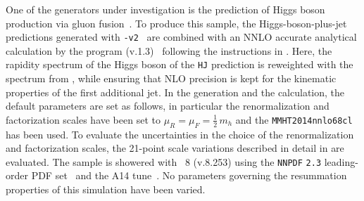\subsubsection{\Powheg \NNLOPS}
\label{sec:hjetscomp:tools:nnlops:powheg}

One of the generators under investigation is the \NNLOPS prediction 
of Higgs boson production via gluon fusion~\cite{Hamilton:2013fea}.
To produce this sample, the Higgs-boson-plus-jet \Minlo~\cite{Hamilton:2012np} 
predictions generated with \PowhegBox{}\texttt{-v2}~\cite{Campbell:2012am} 
are combined with an NNLO accurate analytical calculation by the 
program \HNNLO (v.1.3)~\cite{Catani:2007vq,Grazzini:2008tf,Grazzini:2013mca} 
following the instructions in \cite{Hamilton:2013fea}. Here, the rapidity 
spectrum of the Higgs boson of the \Powheg \texttt{HJ} \Minlo prediction 
is reweighted with the spectrum from \HNNLO, while ensuring that NLO 
precision is kept for the kinematic properties of the first additional jet. 
In the generation and the \HNNLO calculation, the default parameters are 
set as follows, in particular the renormalization and factorization scales 
have been set to $\mu_R = \mu_F = \tfrac{1}{2}\,m_h$ and the 
\texttt{MMHT2014nnlo68cl} \cite{Harland-Lang:2014zoa} has been used. 
To evaluate the uncertainties in the choice of the renormalization and 
factorization scales, the 21-point scale variations described in detail 
in \cite{Hamilton:2013fea} are evaluated.
The \NNLOPS sample is showered with \Pythia~8 (v.8.253) \cite{Sjostrand:2014zea} 
using the \texttt{NNPDF} \texttt{2.3} leading-order PDF set~\cite{Ball:2012cx} 
and the A14 tune~\cite{ATL-PHYS-PUB-2014-021}. No parameters governing the 
resummation properties of this simulation have been varied.

